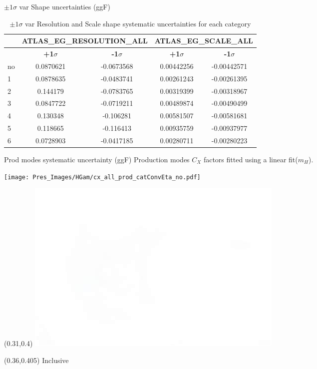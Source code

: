 \documentclass[10pt,UKenglish, leqno, xcolor = dvipsnames]{beamer}
\begin{document}
	\begin{frame}{$\pm1\sigma$ var Shape uncertainties (ggF)}
		\vfill
		\centering
		\begin{table}[tbp]
			\centering
			\begin{tabular}{lcccc}
				\toprule[1.5pt]
				& \multicolumn{2}{c}{ATLAS\_EG\_RESOLUTION\_ALL}	
				& \multicolumn{2}{c}{ATLAS\_EG\_SCALE\_ALL}\\
				\midrule
				& \textbf{+1$\sigma$} & \textbf{-1$\sigma$}
				& \textbf{+1$\sigma$} & \textbf{-1$\sigma$}\\
				\cmidrule(lr){2-3} \cmidrule(lr){4-5}
				no& 0.0870621 & -0.0673568  & 0.00442256 & -0.00442571 \\
				1 & 0.0878635 & -0.0483741 	& 0.00261243 & -0.00261395 \\
				2 & 0.144179  & -0.0783765 	& 0.00319399 & -0.00318967 \\
				3 & 0.0847722 & -0.0719211  & 0.00489874 & -0.00490499 \\
				4 & 0.130348  & -0.106281   & 0.00581507 & -0.00581681 \\
				5 & 0.118665  & -0.116413   & 0.00935759 & -0.00937977 \\
				6 & 0.0728903 & -0.0417185  & 0.00280711 & -0.00280223 \\
				\bottomrule[1.5pt]
			\end{tabular}
			\caption{$\pm1\sigma$ var Resolution and Scale shape systematic uncertainties for each category}
		\end{table}
		\vfill
	\end{frame}
	
	\begin{frame}{Prod modes systematic uncertainty (ggF)}
		\vfill
		Production modes $C_X$ factors fitted using a linear fit($m_H$).
		\begin{center}
			\texttt{[image: Pres\_Images/HGam/cx\_all\_prod\_catConvEta\_no.pdf]}
		\end{center}
		\vfill
		\begin{textblock}{}(0.31,0.4)
			\includegraphics[width=.2\textwidth]{Pres_Images/HGam/white.jpeg}
		\end{textblock}
		\begin{textblock}{}(0.36,0.405)
			\footnotesize
			Inclusive
		\end{textblock}
	\end{frame}
\end{document}
